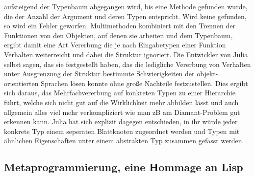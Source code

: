 \documentclass[proseminar,german,utf8]{zihpub}
\begin{document}
aufsteigend der Typenbaum abgegangen wird, bis eine Methode gefunden wurde, die der Anzahl der Argument und deren Typen entspricht. Wird keine gefunden, so wird ein Fehler geworfen. Multimethoden kombiniert mit den Trennen der Funktionen von den Objekten, auf denen sie arbeiten und dem Typenbaum, ergibt damit eine Art Vererbung die je nach Eingabetypen einer Funktion Verhalten weiterreicht und dabei die Struktur ignoriert. Die Entwickler von Julia selbst sagen, das sie festgestellt haben, das die ledigliche Vererbung von Verhalten unter Ausgrenzung der Struktur bestimmte Schwierigkeiten der objekt-orientierten Sprachen lösen konnte ohne große Nachteile festzustellen. Dies ergibt sich daraus, das Mehrfachvererbung auf konkreten Typen zu einer Hierarchie führt, welche sich nicht gut auf die Wirklichkeit mehr abbilden lässt und auch allgemein alles viel mehr verkompliziert wie man zB am Diamant-Problem gut erkennen kann. Julia hat sich explizit dagegen entschieden, in ihr würde jeder konkrete Typ einem seperaten Blattknoten zugeordnet werden und Typen mit ähnlichen Eigenschaften unter einem abstrakten Typ zusammen gefasst werden.

\subsection{Metaprogrammierung, eine Hommage an Lisp}
\end{document}
